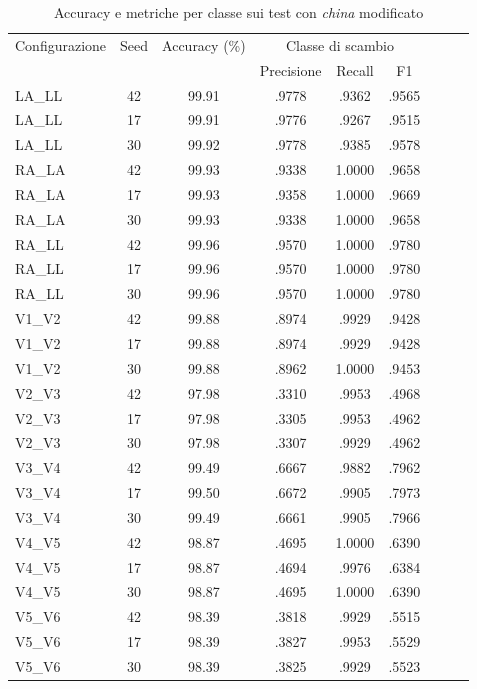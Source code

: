 \begin{table}[htbp]
	\centering
	\caption{Accuracy e metriche per classe sui test con \emph{china} modificato}
	\label{tab:china_mod_classi}
	\scriptsize
	\begin{tabular}{l c c c c c c c c}
		\toprule
		Configurazione & Seed & Accuracy (\%) & \multicolumn{3}{c}{Classe di scambio} \\
		& & & Precisione & Recall & F1 \\
		\midrule
		LA\_LL & 42 & 99.91 & .9778 & .9362 & .9565 \\
		LA\_LL & 17 & 99.91 & .9776 & .9267 & .9515 \\
		LA\_LL & 30 & 99.92 & .9778 & .9385 & .9578 \\
		RA\_LA & 42 & 99.93 & .9338 & 1.0000 & .9658 \\
		RA\_LA & 17 & 99.93 & .9358 & 1.0000 & .9669 \\
		RA\_LA & 30 & 99.93 & .9338 & 1.0000 & .9658 \\
		RA\_LL & 42 & 99.96 & .9570 & 1.0000 & .9780 \\
		RA\_LL & 17 & 99.96 & .9570 & 1.0000 & .9780 \\
		RA\_LL & 30 & 99.96 & .9570 & 1.0000 & .9780 \\
		V1\_V2 & 42 & 99.88 & .8974 & .9929 & .9428 \\
		V1\_V2 & 17 & 99.88 & .8974 & .9929 & .9428 \\
		V1\_V2 & 30 & 99.88 & .8962 & 1.0000 & .9453 \\
		V2\_V3 & 42 & 97.98 & .3310 & .9953 & .4968 \\
		V2\_V3 & 17 & 97.98 & .3305 & .9953 & .4962 \\
		V2\_V3 & 30 & 97.98 & .3307 & .9929 & .4962 \\
		V3\_V4 & 42 & 99.49 & .6667 & .9882 & .7962 \\
		V3\_V4 & 17 & 99.50 & .6672 & .9905 & .7973 \\
		V3\_V4 & 30 & 99.49 & .6661 & .9905 & .7966 \\
		V4\_V5 & 42 & 98.87 & .4695 & 1.0000 & .6390 \\
		V4\_V5 & 17 & 98.87 & .4694 & .9976 & .6384 \\
		V4\_V5 & 30 & 98.87 & .4695 & 1.0000 & .6390 \\
		V5\_V6 & 42 & 98.39 & .3818 & .9929 & .5515 \\
		V5\_V6 & 17 & 98.39 & .3827 & .9953 & .5529 \\
		V5\_V6 & 30 & 98.39 & .3825 & .9929 & .5523 \\
		\bottomrule
	\end{tabular}
\end{table}

